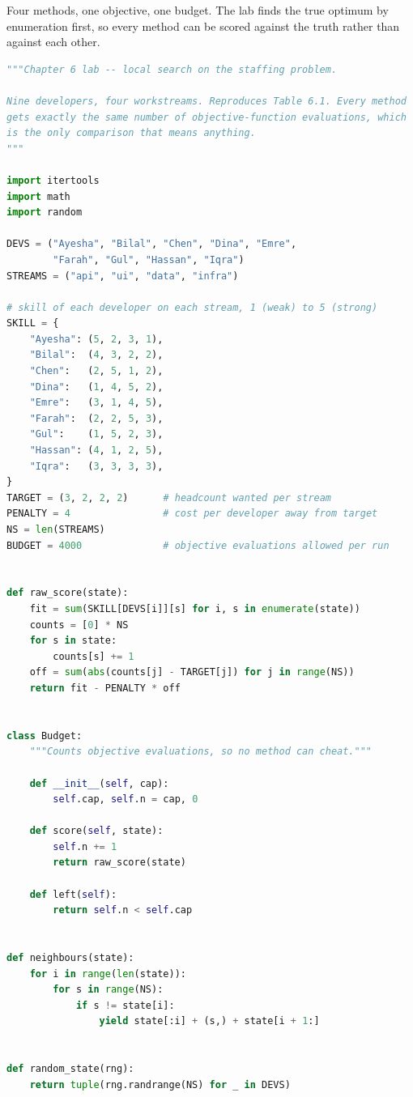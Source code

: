 \begin{lab}
Four methods, one objective, one budget. The lab finds the true optimum by
enumeration first, so every method can be scored against the truth rather than
against each other.
\begin{lstlisting}[language=Python]
"""Chapter 6 lab -- local search on the staffing problem.

Nine developers, four workstreams. Reproduces Table 6.1. Every method
gets exactly the same number of objective-function evaluations, which
is the only comparison that means anything.
"""

import itertools
import math
import random

DEVS = ("Ayesha", "Bilal", "Chen", "Dina", "Emre",
        "Farah", "Gul", "Hassan", "Iqra")
STREAMS = ("api", "ui", "data", "infra")

# skill of each developer on each stream, 1 (weak) to 5 (strong)
SKILL = {
    "Ayesha": (5, 2, 3, 1),
    "Bilal":  (4, 3, 2, 2),
    "Chen":   (2, 5, 1, 2),
    "Dina":   (1, 4, 5, 2),
    "Emre":   (3, 1, 4, 5),
    "Farah":  (2, 2, 5, 3),
    "Gul":    (1, 5, 2, 3),
    "Hassan": (4, 1, 2, 5),
    "Iqra":   (3, 3, 3, 3),
}
TARGET = (3, 2, 2, 2)      # headcount wanted per stream
PENALTY = 4                # cost per developer away from target
NS = len(STREAMS)
BUDGET = 4000              # objective evaluations allowed per run


def raw_score(state):
    fit = sum(SKILL[DEVS[i]][s] for i, s in enumerate(state))
    counts = [0] * NS
    for s in state:
        counts[s] += 1
    off = sum(abs(counts[j] - TARGET[j]) for j in range(NS))
    return fit - PENALTY * off


class Budget:
    """Counts objective evaluations, so no method can cheat."""

    def __init__(self, cap):
        self.cap, self.n = cap, 0

    def score(self, state):
        self.n += 1
        return raw_score(state)

    def left(self):
        return self.n < self.cap


def neighbours(state):
    for i in range(len(state)):
        for s in range(NS):
            if s != state[i]:
                yield state[:i] + (s,) + state[i + 1:]


def random_state(rng):
    return tuple(rng.randrange(NS) for _ in DEVS)



\end{lstlisting}
\end{lab}
